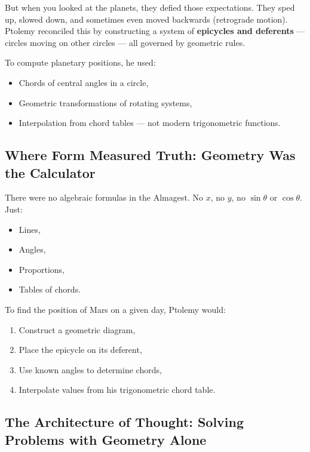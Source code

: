 But when you looked at the planets, they defied those expectations. They sped up, slowed down, and sometimes even moved backwards (retrograde motion). Ptolemy reconciled this by constructing a system of \textbf{epicycles and deferents} — circles moving on other circles — all governed by geometric rules.

To compute planetary positions, he used:

\begin{itemize}
    \item Chords of central angles in a circle,
    \item Geometric transformations of rotating systems,
    \item Interpolation from chord tables — not modern trigonometric functions.
\end{itemize}

\subsection{Where Form Measured Truth: Geometry Was the Calculator}

There were no algebraic formulas in the Almagest. No \( x \), no \( y \), no \( \sin \theta \) or \( \cos \theta \). Just:

\begin{itemize}
    \item Lines,
    \item Angles,
    \item Proportions,
    \item Tables of chords.
\end{itemize}

To find the position of Mars on a given day, Ptolemy would:

\begin{enumerate}
    \item Construct a geometric diagram,
    \item Place the epicycle on its deferent,
    \item Use known angles to determine chords,
    \item Interpolate values from his trigonometric chord table.
\end{enumerate}

\subsection{The Architecture of Thought: Solving Problems with Geometry Alone}


